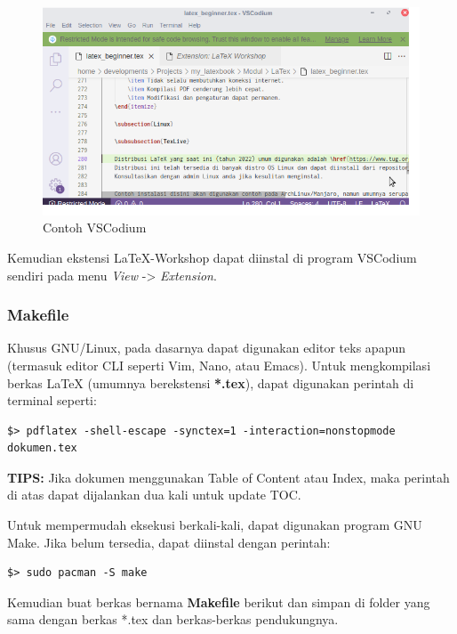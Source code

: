 \documentclass{book} %
\begin{document}
	\begin{figure}[!ht]
		\centering
		\includegraphics[width=400pt]{images/vscodium}
		\caption{Contoh VSCodium}
	\end{figure}

	Kemudian ekstensi LaTeX-Workshop dapat diinstal di program VSCodium sendiri pada menu \textit{View} -> \textit{Extension}.

	\newpage

	\subsubsection{Makefile}

	Khusus GNU/Linux, pada dasarnya dapat digunakan editor teks apapun (termasuk editor CLI seperti Vim, Nano, atau Emacs).
	Untuk mengkompilasi berkas \LaTeX{} (umumnya berekstensi \textbf{*.tex}), dapat digunakan perintah di terminal seperti:

	\begin{verbatim}
$> pdflatex -shell-escape -synctex=1 -interaction=nonstopmode dokumen.tex
	\end{verbatim}

	\textbf{TIPS:} Jika dokumen menggunakan Table of Content atau Index, maka perintah di atas dapat dijalankan dua kali untuk update TOC.

	Untuk mempermudah eksekusi berkali-kali, dapat digunakan program GNU Make.
	Jika belum tersedia, dapat diinstal dengan perintah:

	\begin{verbatim}
$> sudo pacman -S make
	\end{verbatim}

	Kemudian buat berkas bernama \textbf{Makefile} berikut dan simpan di folder yang sama dengan berkas *.tex dan berkas-berkas pendukungnya.
\end{document}
